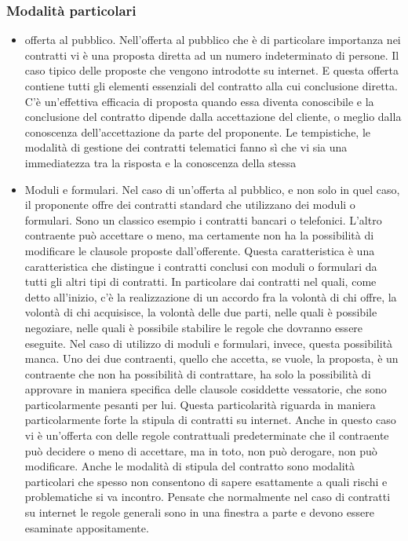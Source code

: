 \subsubsection{Modalità particolari}
\begin{itemize}
    \item offerta al pubblico. Nell'offerta al pubblico che è di particolare importanza nei contratti vi è una proposta diretta ad un numero indeterminato di persone. Il caso tipico delle proposte che vengono introdotte su internet. E questa offerta contiene tutti gli elementi essenziali del contratto alla cui conclusione diretta. C'è un'effettiva efficacia di proposta quando essa diventa conoscibile e la conclusione del contratto dipende dalla accettazione del cliente, o meglio dalla conoscenza dell'accettazione da parte del proponente. Le tempistiche, le modalità di gestione dei contratti telematici fanno sì che vi sia una immediatezza tra la risposta e la conoscenza della stessa
    \item Moduli e formulari. Nel caso di un'offerta al pubblico, e non solo in quel caso, il proponente offre dei contratti standard che utilizzano dei moduli o formulari. Sono un classico esempio i contratti bancari o telefonici. L'altro contraente può accettare o meno, ma certamente non ha la possibilità di modificare le clausole proposte dall'offerente. Questa caratteristica è una caratteristica che distingue i contratti conclusi con moduli o formulari da tutti gli altri tipi di contratti. In particolare dai contratti nel quali, come detto all'inizio, c'è la realizzazione di un accordo fra la volontà di chi offre, la volontà di chi acquisisce, la volontà delle due parti, nelle quali è possibile negoziare, nelle quali è possibile stabilire le regole che dovranno essere eseguite. Nel caso di utilizzo di moduli e formulari, invece, questa possibilità manca. Uno dei due contraenti, quello che accetta, se vuole, la proposta, è un contraente che non ha possibilità di contrattare, ha solo la possibilità di approvare in maniera specifica delle clausole cosiddette vessatorie, che sono particolarmente pesanti per lui. Questa particolarità riguarda in maniera particolarmente forte la stipula di contratti su internet. Anche in questo caso vi è un'offerta con delle regole contrattuali predeterminate che il contraente può decidere o meno di accettare, ma in toto, non può derogare, non può modificare. Anche le modalità di stipula del contratto sono modalità particolari che spesso non consentono di sapere esattamente a quali rischi e problematiche si va incontro. Pensate che normalmente nel caso di contratti su internet le regole generali sono in una finestra a parte e devono essere esaminate appositamente.
\end{itemize} 

